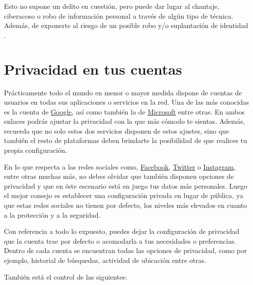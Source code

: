 \documentclass[
  a4paper,
  openany]{book}
\begin{document}
Esto no supone un delito en cuestión, pero puede dar lugar al chantaje, ciberacoso o robo de información personal a través de algún tipo de técnica. Además, de exponerte al riesgo de un posible robo y/o suplantación de identidad \citep{AEPD-oversharing}.

\hypertarget{privacidad-en-tus-cuentas}{%
\section{Privacidad en tus cuentas}\label{privacidad-en-tus-cuentas}}

Prácticamente todo el mundo en menor o mayor medida dispone de cuentas de usuarios en todas sus aplicaciones o servicios en la red. Una de las más conocidas es la cuenta de \href{https://myaccount.google.com/data-and-personalization}{Google}, así como también la de \href{https://account.microsoft.com/account/privacy}{Microsoft} entre otras. En ambos enlaces podrás ajustar la privacidad con la que más cómodo te sientas. Además, recuerda que no solo estos dos servicios disponen de estos ajustes, sino que también el resto de plataformas deben brindarte la posibilidad de que realices tu propia configuración.

En lo que respecta a las redes sociales como, \href{https://es-la.facebook.com/help/325807937506242}{Facebook}, \href{https://help.twitter.com/es/safety-and-security\#ads-and-data-privacy}{Twitter} o \href{https://es-es.facebook.com/help/instagram/196883487377501/?helpref=hc_fnav\&bc\%5B0\%5D=Ayuda\%20de\%20Instagram\&bc\%5B1\%5D=Administrar\%20tu\%20cuenta}{Instagram}, entre otras muchas más, no debes olvidar que también disponen opciones de privacidad y que en éste escenario está en juego tus datos más personales. Luego el mejor consejo es establecer una configuración privada en lugar de pública, ya que estas redes sociales no tienen por defecto, los niveles más elevados en cuanto a la protección y a la seguridad.

Con referencia a todo lo expuesto, puedes dejar la configuración de privacidad que la cuenta trae por defecto o acomodarla a tus necesidades o preferencias. Dentro de cada cuenta se encuentran todas las opciones de privacidad, como por ejemplo, historial de búsquedas, actividad de ubicación entre otras.

También está el control de las siguientes:
\end{document}
